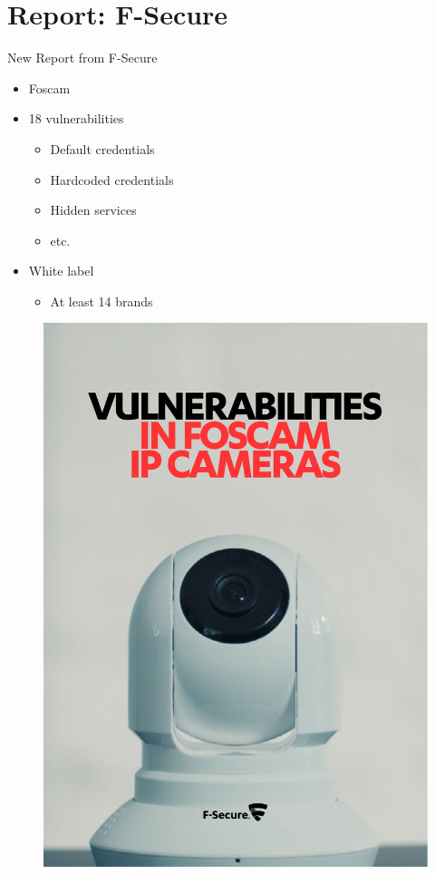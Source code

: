 \section{Report: F-Secure}

\begin{frame}{New Report from F-Secure}
\begin{minipage}{0.48\textwidth}
\begin{itemize}
	\item Foscam 
	\item 18 vulnerabilities
	\begin{itemize}
		\item Default credentials
		\item Hardcoded credentials
		\item Hidden services
		\item etc.
	\end{itemize}
	\item White label
	\begin{itemize}
		\item At least 14 brands
	\end{itemize}
\end{itemize}

\end{minipage}
%
\hfill
%
\begin{minipage}{0.48\textwidth}
\begin{figure}
	
	\includegraphics[width=\textwidth]{figs/f-secure}
\end{figure}
\end{minipage}


\end{frame}
